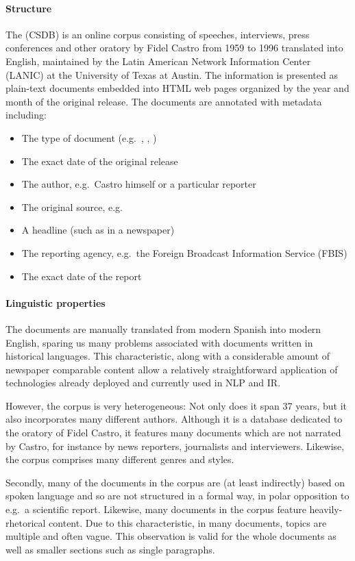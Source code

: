 \paragraph{Structure}
The  (CSDB) is an online corpus consisting of speeches, interviews, press conferences and other oratory by Fidel Castro from 1959 to 1996 translated into English, maintained by the Latin American Network Information Center (LANIC) at the University of Texas at Austin. The information is presented as plain-text documents embedded into HTML web pages organized by the year and month of the original release. The documents are annotated with metadata including:

\begin{itemize}
\item The type of document (e.g.\ , , )
\item The exact date of the original release
\item The author, e.g.\ Castro himself or a particular reporter
\item The original source, e.g.\ 
\item A headline (such as in a newspaper)
\item The reporting agency, e.g.\ the Foreign Broadcast Information Service (FBIS)
\item The exact date of the report
\end{itemize}

\paragraph{Linguistic properties}
The documents are manually translated from modern Spanish into modern English, sparing us many problems associated with documents written in historical languages. This characteristic, along with a considerable amount of newspaper comparable content allow a relatively straightforward application of technologies already deployed and currently used in NLP and IR.

However, the corpus is very heterogeneous: Not only does it span 37 years, but it also incorporates many different authors. Although it is a database dedicated to the oratory of Fidel Castro, it features many documents which are not narrated by Castro, for instance by news reporters, journalists and interviewers. Likewise, the corpus comprises many different genres and styles.

Secondly, many of the documents in the corpus are (at least indirectly) based on spoken language and so are not structured in a formal way, in polar opposition to e.g.\ a scientific report. Likewise, many documents in the corpus feature heavily-rhetorical content. Due to this characteristic, in many documents, topics are multiple and often vague. This observation is valid for the whole documents as well as smaller sections such as single paragraphs. 

